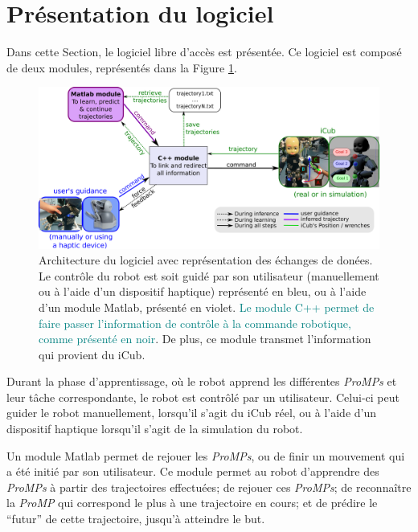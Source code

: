 \documentclass[utf8]{frontiersSCNS} %
\newcommand{\toimprove}[1]{\textcolor{teal}{#1}}
\newcommand{\todo}[1]{\textcolor{red}{\textbf{/*#1*/}}}
\begin{document}
\section{Présentation du logiciel}\label{sec:softwareOverview}

Dans cette Section, le logiciel libre d'accès est présentée. Ce logiciel est composé de deux modules, représentés dans la Figure \ref{fig:orgaSoftware}.

\label{sec:software}
\begin{figure}[h]
\center
\includegraphics[width=\hsize]{img/liaisonAllProgramV3.pdf}
\caption{Architecture du logiciel avec représentation des échanges de donées.\\ Le contrôle du robot est soit guidé par son utilisateur (manuellement ou à l'aide d'un dispositif haptique) représenté en bleu, ou à l'aide d'un module Matlab, présenté en violet. \toimprove{Le module  C++ permet de faire passer l'information de contrôle à la commande robotique, comme présenté en noir}. De plus, ce module transmet l'information qui provient du iCub.}
\label{fig:orgaSoftware}
\end{figure}

Durant la phase d'apprentissage, où le robot apprend les différentes \textit{ProMPs} et leur tâche correspondante, le robot est contrôlé par un utilisateur. Celui-ci peut guider le robot manuellement, lorsqu'il s'agit du iCub réel, ou à l'aide d'un dispositif haptique lorsqu'il s'agit de la simulation du robot.

Un module Matlab permet de rejouer les \textit{ProMPs}, ou de finir un mouvement qui a été initié par son utilisateur. Ce module permet au robot d'apprendre des \textit{ProMPs} à partir des trajectoires effectuées; de rejouer ces \textit{ProMPs}; de reconnaître la \textit{ProMP} qui correspond le plus à une trajectoire en cours; et de prédire le ``futur'' de cette trajectoire, jusqu'à atteindre le but.
\end{document}
